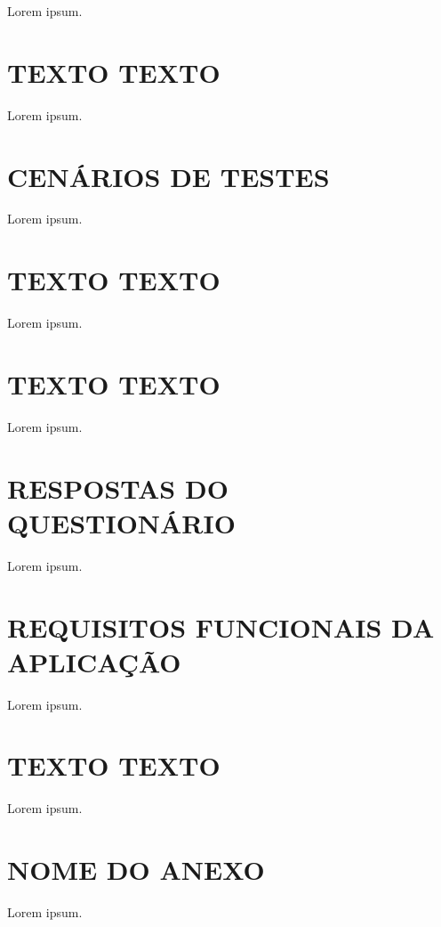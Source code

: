 \documentclass[english,brazilian]{UNISINOSartigo} %
\begin{document}
Lorem ipsum.

\section{TEXTO TEXTO}

Lorem ipsum.

\section{CENÁRIOS DE TESTES}

Lorem ipsum.

\section{TEXTO TEXTO}

Lorem ipsum.

\section{TEXTO TEXTO}

Lorem ipsum.

\section{RESPOSTAS DO QUESTIONÁRIO}

Lorem ipsum.

\section{REQUISITOS FUNCIONAIS DA APLICAÇÃO}

Lorem ipsum.

\section{TEXTO TEXTO}

Lorem ipsum.

\annex
\section{NOME DO ANEXO}

Lorem ipsum.
\end{document}

